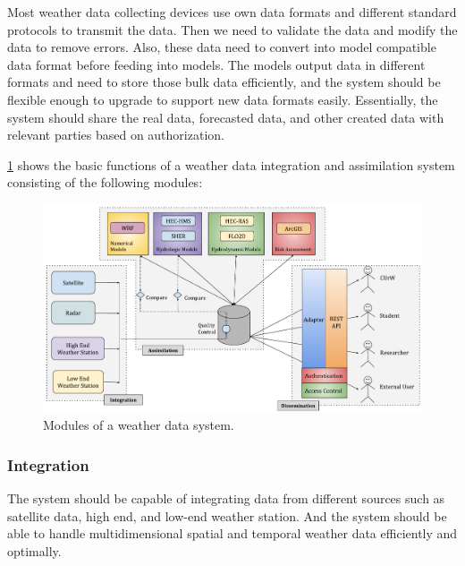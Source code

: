 Most weather data collecting devices use own data formats and different standard protocols to transmit the data. Then we need to validate the data and modify the data to remove errors. Also, these data need to convert into model compatible data format before feeding into models. The models output data in different formats and need to store those bulk data efficiently, and the system should be flexible enough to upgrade to support new data formats easily. Essentially, the system should share the real data, forecasted data, and other created data with relevant parties based on authorization.



\cref{fi:wdia_components} shows the basic functions of a weather data integration and assimilation system consisting of the following modules: 

\begin{figure}[htbp]
\centerline{\includegraphics[width=1\textwidth]{method/misc/weather_data_system_components.pdf}}
\caption{Modules of a weather data system.}
\label{fi:wdia_components}
\end{figure}

\subsubsection{Integration }
The system should be capable of integrating data from different sources such as satellite data, high end, and low-end weather station. And the system should be able to handle multidimensional spatial and temporal weather data efficiently and optimally.
